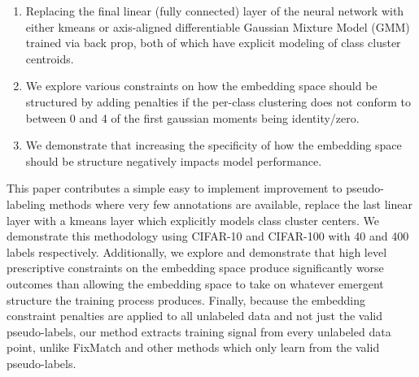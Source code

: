 \documentclass[10pt,twocolumn,letterpaper]{article}
\begin{document}
\begin{enumerate}
	\item Replacing the final linear (fully connected) layer of the neural network with either kmeans \cite{dwibedi2021little} or axis-aligned differentiable Gaussian Mixture Model (GMM) trained via back prop, both of which have explicit modeling of class cluster centroids. 
	\item We explore various constraints on how the embedding space should be structured by adding penalties if the per-class clustering does not conform to between 0 and 4 of the first gaussian moments being identity/zero.
	\item We demonstrate that increasing the specificity of how the embedding space should be structure negatively impacts model performance. %
\end{enumerate}

This paper contributes a simple easy to implement improvement to pseudo-labeling methods where very few annotations are available, replace the last linear layer with a kmeans layer which explicitly models class cluster centers.
We demonstrate this methodology using CIFAR-10 and CIFAR-100 \cite{cifar10} with 40 and 400 labels respectively. 
Additionally, we explore and demonstrate that high level prescriptive constraints on the embedding space produce significantly worse outcomes than allowing the embedding space to take on whatever emergent structure the training process produces. 
Finally, because the embedding constraint penalties are applied to all unlabeled data and not just the valid pseudo-labels, our method extracts training signal from every unlabeled data point, unlike FixMatch \cite{sohn2020fixmatch} and other methods which only learn from the valid pseudo-labels.



\end{document}
